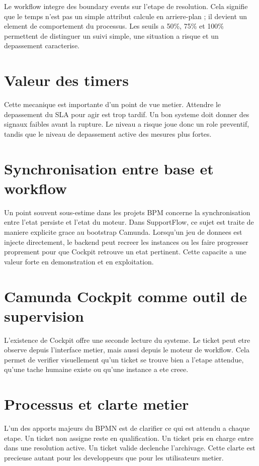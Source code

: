 Le workflow integre des boundary events sur l'etape de resolution. Cela signifie que le temps n'est pas un simple attribut calcule en arriere-plan ; il devient un element de comportement du processus. Les seuils a 50\%, 75\% et 100\% permettent de distinguer un suivi simple, une situation a risque et un depassement caracterise.

\section{Valeur des timers}

Cette mecanique est importante d'un point de vue metier. Attendre le depassement du SLA pour agir est trop tardif. Un bon systeme doit donner des signaux faibles avant la rupture. Le niveau a risque joue donc un role preventif, tandis que le niveau de depassement active des mesures plus fortes.

\section{Synchronisation entre base et workflow}

Un point souvent sous-estime dans les projets BPM concerne la synchronisation entre l'etat persiste et l'etat du moteur. Dans SupportFlow, ce sujet est traite de maniere explicite grace au bootstrap Camunda. Lorsqu'un jeu de donnees est injecte directement, le backend peut recreer les instances ou les faire progresser proprement pour que Cockpit retrouve un etat pertinent. Cette capacite a une valeur forte en demonstration et en exploitation.

\section{Camunda Cockpit comme outil de supervision}

L'existence de Cockpit offre une seconde lecture du systeme. Le ticket peut etre observe depuis l'interface metier, mais aussi depuis le moteur de workflow. Cela permet de verifier visuellement qu'un ticket se trouve bien a l'etape attendue, qu'une tache humaine existe ou qu'une instance a ete creee.

\section{Processus et clarte metier}

L'un des apports majeurs du BPMN est de clarifier ce qui est attendu a chaque etape. Un ticket non assigne reste en qualification. Un ticket pris en charge entre dans une resolution active. Un ticket valide declenche l'archivage. Cette clarte est precieuse autant pour les developpeurs que pour les utilisateurs metier.

